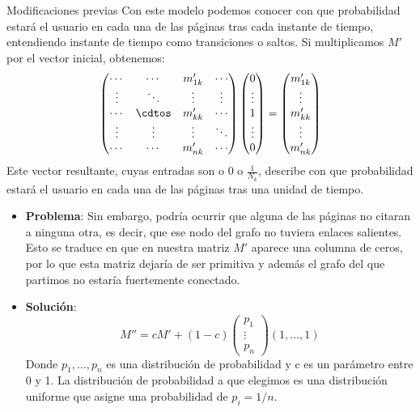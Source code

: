 \documentclass[ignorenonframetext,aspectratio=43,]{beamer}
\begin{document}
\begin{frame}{Modificaciones previas}
Con este modelo podemos conocer con que probabilidad estará el usuario en cada una de las páginas tras cada instante de tiempo, entendiendo instante de tiempo como transiciones o saltos.
Si multiplicamos $M'$ por el vector inicial, obtenemos:
$$\begin{pmatrix}
\cdots & \cdots & m'_{1k} & \cdots \\
\vdots & \ddots & \vdots & \vdots \\
\cdots & \cdtos & m'_{kk} & \cdots \\
\vdots & \vdots & \vdots & \ddots \\
\cdots & \cdots & m'_{nk} & \cdots \end{pmatrix} \begin{pmatrix}
0 \\
\vdots \\
1 \\
\vdots \\
0 \end{pmatrix} = \begin{pmatrix}
m'_{1k}\\
\vdots \\
m'_{kk} \\
\vdots \\
m'_{nk} \end{pmatrix}$$
Este vector resultante, cuyas entradas son o 0 o $\frac{1}{N_k}$, describe con que probabilidad estará el usuario en cada una de las páginas tras una unidad de tiempo.
\end{frame}
\begin{frame}
\begin{itemize}
\item \textbf{Problema}: Sin embargo, podría ocurrir que alguna de las páginas no citaran a ninguna otra, es decir, que ese nodo del grafo no tuviera enlaces salientes. Esto se traduce en que en nuestra matriz $M'$ aparece una columna de ceros, por lo que esta matriz dejaría de ser primitiva y además el grafo del que partimos no estaría fuertemente conectado.
\item \textbf{Solución}:
$$M'' = cM' + (1-c)\begin{pmatrix}
p_1 \\
\vdots \\
p_n \end{pmatrix} (1, \dots, 1)$$
Donde $p_1 , \dots , p_n$ es una distribución de probabilidad y c es un parámetro entre 0 y 1. La distribución de probabilidad a que elegimos es una distribución uniforme que asigne una probabilidad de $p_i = 1/n$.
\end{itemize}
\end{frame}
\end{document}
